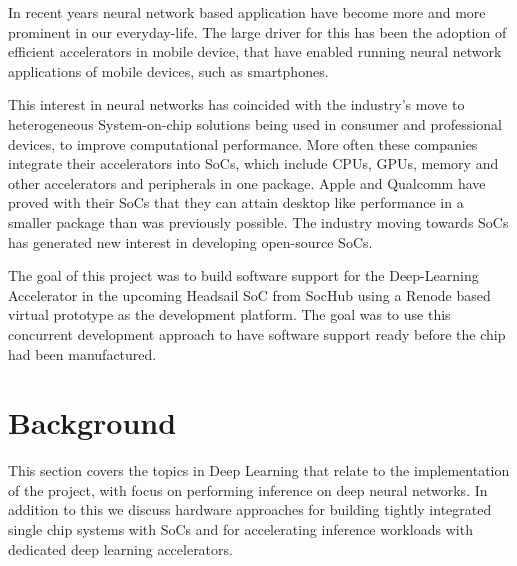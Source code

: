 \documentclass[12pt,a4paper,english
]{tunithesis}
\begin{document}
In recent years neural network based application have become more and more prominent in our everyday-life. The large driver for this has been the adoption of efficient accelerators in mobile device, that have enabled running neural network applications of mobile devices, such as smartphones.

This interest in neural networks has coincided with the industry's move to heterogeneous System-on-chip solutions being used in consumer and professional devices, to improve computational performance.
More often these companies integrate their accelerators into SoCs, which include CPUs, GPUs, memory and other accelerators and peripherals in one package. Apple and Qualcomm have proved with their SoCs that they can attain desktop like performance in a smaller package than was previously possible. The industry moving towards SoCs has generated new interest in developing open-source SoCs.

The goal of this project was to build software support for the Deep-Learning Accelerator in the upcoming Headsail SoC from SocHub using a Renode based virtual prototype as the development platform. The goal was to use this concurrent development approach to have software support ready before the chip had been manufactured.

\chapter{Background}
This section covers the topics in Deep Learning that relate to the implementation of the project, with focus on performing inference on deep neural networks. In addition to this we discuss hardware approaches for building tightly integrated single chip systems with SoCs and for accelerating inference workloads with dedicated deep learning accelerators.
\label{ch:background}
\end{document}
